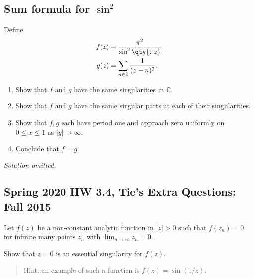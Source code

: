 \hypertarget{sum-formula-for-sin2}{%
\subsection{\texorpdfstring{Sum formula for
\(\sin^2\)}{Sum formula for \textbackslash sin\^{}2}}\label{sum-formula-for-sin2}}

\begin{problem}[?]

Define
\begin{align*}
f(z) &= {\pi^2 \over \sin^2 \qty{\pi z} } \\
g(z) &= \sum_{n\in {\mathbb{Z}}} {1\over (z-n)^2}
.\end{align*}

\begin{enumerate}
\def\labelenumi{\alph{enumi}.}
\tightlist
\item
  Show that \(f\) and \(g\) have the same singularities in
  \({\mathbb{C}}\).
\item
  Show that \(f\) and \(g\) have the same singular parts at each of
  their singularities.
\item
  Show that \(f, g\) each have period one and approach zero uniformly on
  \(0\leq x \leq 1\) as \({\left\lvert {y} \right\rvert}\to \infty\).
\item
  Conclude that \(f = g\).
\end{enumerate}

\end{problem}

\emph{Solution omitted.}

\hypertarget{spring-2020-hw-3.4-ties-extra-questions-fall-2015}{%
\subsection{Spring 2020 HW 3.4, Tie's Extra Questions: Fall
2015}\label{spring-2020-hw-3.4-ties-extra-questions-fall-2015}}

\begin{problem}[?]

Let \(f(z)\) be a non-constant analytic function in \(|z|>0\) such that
\(f(z_n) = 0\) for infinite many points \(z_n\) with
\(\lim_{n \rightarrow \infty} z_n =0\).

Show that \(z=0\) is an essential singularity for \(f(z)\).

\begin{quote}
Hint: an example of such a function is \(f(z) = \sin (1/z)\).
\end{quote}

\end{problem}


